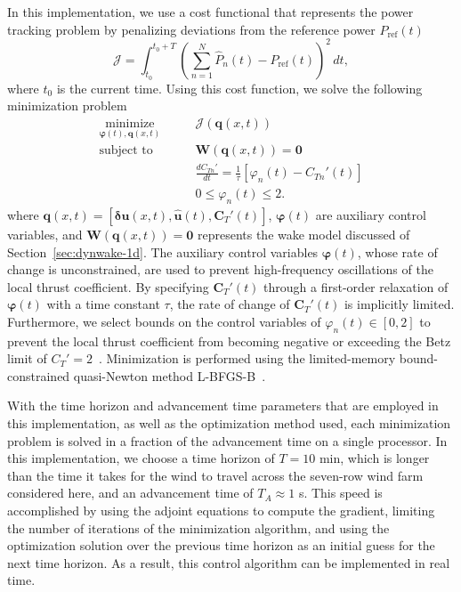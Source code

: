 In this implementation, we use a cost functional that represents the power tracking problem by penalizing deviations from the reference power $P_\text{ref}(t)$
\begin{equation}
\mathcal{J} = \int_{t_0}^{t_0+T} \left( \sum_{n=1}^N \hat{P}_n(t) - P_\text{ref}(t) \right)^2 \, dt,
\end{equation}
where $t_0$ is the current time. Using this cost function, we solve the following minimization problem
\begin{align}
\label{eq:minimize_J_enkf}
\underset{\boldsymbol \varphi(t), \mathbf{q}(x,t)}{\text{minimize}} \qquad & \mathcal{J}(\mathbf{q}(x,t)) \\
\label{eq:constraint1_enkf}
\text{subject to} \qquad& \mathbf{W}(\mathbf{q}(x,t)) = \mathbf{0} \\
\label{eq:constraint2_enkf}
& \frac{dC_{Tn}'}{dt} = \frac{1}{\tau} \left[ \varphi_n(t) - C_{Tn}'(t)\right]\\
\label{eq:constraint3_enkf}
& 0 \le \varphi_n(t) \le 2.
\end{align}
where $\mathbf{q}(x,t) = [\boldsymbol \delta \mathbf{u}(x,t), \mathbf{\hat{u}}(t), \mathbf{C}_T'(t)]$, $\boldsymbol \varphi(t)$ are auxiliary control variables, and $\mathbf{W}(\mathbf{q}(x,t)) = \mathbf{0}$ represents the wake model discussed of Section~\ref{sec:dynwake-1d}. The auxiliary control variables $\boldsymbol \varphi(t)$, whose rate of change is unconstrained, are used to prevent high-frequency oscillations of the local thrust coefficient. By specifying $\mathbf{C}_T'(t)$ through a  first-order relaxation of $\boldsymbol \varphi(t)$ with a time constant $\tau$, the rate of change of $\mathbf{C}_T'(t)$ is implicitly limited. Furthermore, we select bounds on the control variables of $\varphi_n(t) \in [0, 2]$ to prevent the local thrust coefficient from becoming negative or exceeding the Betz limit of $C_T'=2$~\cite{Meyers2016a}. Minimization is performed using the limited-memory bound-constrained quasi-Newton method L-BFGS-B~\cite{Zhu1997a}. 

With the time horizon and advancement time parameters that are employed in this implementation, as well as the optimization method used, each minimization problem is solved in a fraction of the advancement time on a single processor. In this implementation, we choose a time horizon of $T = 10$ min, which is longer than the time it takes for the wind to travel across the seven-row wind farm considered here, and an advancement time of $T_A \approx 1$ s. This speed is accomplished by using the adjoint equations to compute the gradient, limiting the number of iterations of the minimization algorithm, and using the optimization solution over the previous time horizon as an initial guess for the next time horizon. As a result, this control algorithm can be implemented in real time.

